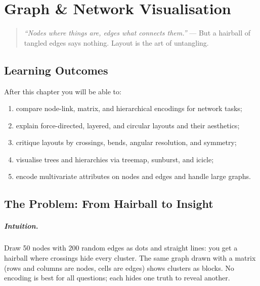\chapter{Graph \& Network Visualisation}
\label{ch:network}
\sloppy

\begin{quote}
\emph{``Nodes where things are, edges what connects them.''} --- But a hairball of tangled edges says nothing. Layout is the art of untangling.
\end{quote}

\noindent{}
\vspace{0.4em}

\section*{Learning Outcomes}
After this chapter you will be able to:
\begin{enumerate}[label=(L\arabic*)]
    \item compare node-link, matrix, and hierarchical encodings for network tasks;
    \item explain force-directed, layered, and circular layouts and their aesthetics;
    \item critique layouts by crossings, bends, angular resolution, and symmetry;
    \item visualise trees and hierarchies via treemap, sunburst, and icicle;
    \item encode multivariate attributes on nodes and edges and handle large graphs.
\end{enumerate}

\section{The Problem: From Hairball to Insight}
\label{sec:hairball}
\paragraph{Intuition.} Draw 50 nodes with 200 random edges as dots and straight lines: you get a hairball where crossings hide every cluster. The same graph drawn with a matrix (rows and columns are nodes, cells are edges) shows clusters as blocks. No encoding is best for all questions; each hides one truth to reveal another.

